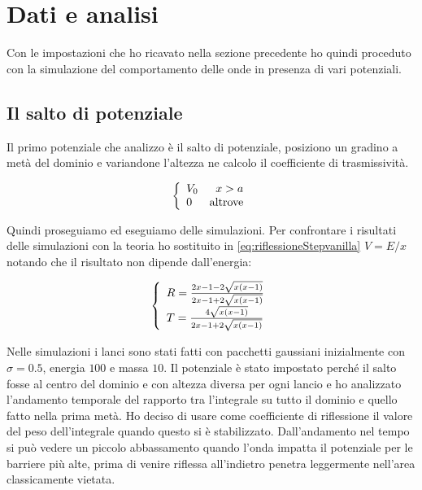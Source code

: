 \section{Dati e analisi}
Con le impostazioni che ho ricavato nella sezione precedente ho quindi proceduto con la simulazione del comportamento delle onde in presenza di vari potenziali.
\subsection{Il salto di potenziale}
Il primo potenziale che analizzo \`e il salto di potenziale, posiziono un gradino a met\`a del dominio e variandone l'altezza ne calcolo il coefficiente di trasmissivit\`a.

\begin{equation}\label{eq:Salto}
  \lr\{.{\begin{array}{lr}
      V_0& x>a\\
      0&\text{altrove}
  \end{array}}
\end{equation}


Quindi proseguiamo ed eseguiamo delle simulazioni. Per confrontare i risultati delle simulazioni con la teoria ho sostituito in \eqref{eq:riflessioneStepvanilla} $V =  E/x$ notando che il risultato non dipende dall'energia:

\begin{equation}
\lr\{.{\begin{array}{l}
	R =  \frac{2 x -1 -2 \sqrt{x\lrt{x-1}}}{2x -1 +2 \sqrt{x\lrt{x-1}}}\\
	T =  \frac{4 \sqrt{x\lrt{x-1}}}{2x -1 +2 \sqrt{x\lrt{x-1}}}
	\end{array}}
\end{equation}

Nelle simulazioni i lanci sono stati fatti con pacchetti gaussiani inizialmente con $\sigma=0.5$, energia $100$ e massa $10$. Il potenziale \`e stato impostato perch\'e il salto fosse al centro del dominio e con altezza diversa per ogni lancio e ho analizzato l'andamento temporale del rapporto tra l'integrale su tutto il dominio e quello fatto nella prima met\`a.
Ho deciso di usare come coefficiente di riflessione il valore del peso dell'integrale quando questo si \`e stabilizzato.
Dall'andamento nel tempo si pu\`o vedere un piccolo abbassamento quando l'onda impatta il potenziale per le barriere pi\`u alte, prima di venire riflessa all'indietro penetra leggermente nell'area classicamente vietata.

